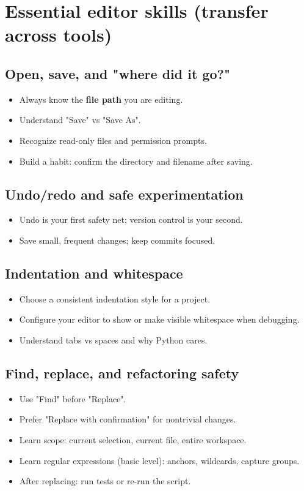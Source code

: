 \section{Essential editor skills (transfer across tools)}
\subsection{Open, save, and "where did it go?"}
\begin{itemize}
\item Always know the \textbf{file path} you are editing.
\item Understand "Save" vs "Save As".
\item Recognize read-only files and permission prompts.
\item Build a habit: confirm the directory and filename after saving.
\end{itemize}

\subsection{Undo/redo and safe experimentation}
\begin{itemize}
\item Undo is your first safety net; version control is your second.
\item Save small, frequent changes; keep commits focused.
\end{itemize}

\subsection{Indentation and whitespace}
\begin{itemize}
\item Choose a consistent indentation style for a project.
\item Configure your editor to show or make visible whitespace when debugging.
\item Understand tabs vs spaces and why Python cares.
\end{itemize}

\subsection{Find, replace, and refactoring safety}
\begin{itemize}
\item Use "Find" before "Replace".
\item Prefer "Replace with confirmation" for nontrivial changes.
\item Learn scope: current selection, current file, entire workspace.
\item Learn regular expressions (basic level): anchors, wildcards, capture groups.
\item After replacing: run tests or re-run the script.
\end{itemize}

